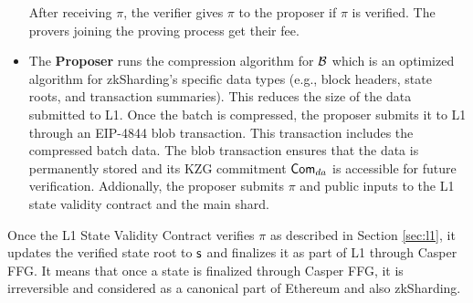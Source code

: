 \begin{itemize}
	      After receiving $\pi$, the verifier gives
	      $\pi$ to the proposer if $\pi $ is verified.
	      The provers joining the proving process get their fee.
	\item The \textbf{Proposer} runs the compression algorithm
	      for $\mathcal{B}$ which is an optimized algorithm
	      for zkSharding’s specific data types (e.g., block headers,
	      state roots,
	      and transaction summaries). This reduces the size of the
	      data submitted to
	      L1. Once the batch is compressed, the proposer submits it to
	      L1 through an
	      EIP-4844 blob transaction. This transaction includes the
	      compressed batch
	      data. The blob transaction ensures that the data is
	      permanently
	      stored and its KZG commitment $\mathsf{Com}_{da}$ is accessible for
	      future
	      verification.
	      Addionally, the proposer submits $\pi$ and public inputs to
	      the
	      L1 state validity contract and the main shard.
\end{itemize}

Once the L1 State Validity Contract verifies $\pi$ as described in Section
\ref{sec:l1}, it updates the verified state root to $\mathsf{s}$ and
finalizes it as part of L1 through Casper FFG. It means that once a state
is finalized  through Casper FFG, it is irreversible and considered as a
canonical part of  Ethereum and also zkSharding.

